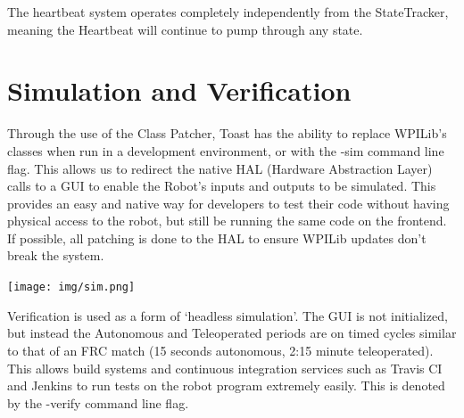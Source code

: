 \documentclass[a4paper,12pt]{article}
\begin{document}
The heartbeat system operates completely independently from the StateTracker, meaning the Heartbeat will continue to pump through any state.

\newpage

\section{Simulation and Verification}
Through the use of the Class Patcher, Toast has the ability to replace WPILib's classes when run in a development environment, or with the -sim command line flag. This allows us to redirect the native HAL (Hardware Abstraction Layer) calls to a GUI to enable the Robot's inputs and outputs to be simulated. This provides an easy and native way for developers to test their code without having physical access to the robot, but still be running the same code on the frontend. If possible, all patching is done to the HAL to ensure WPILib updates don't break the system. 

\texttt{[image: img/sim.png]}

Verification is used as a form of `headless simulation'. The GUI is not initialized, but instead the Autonomous and Teleoperated periods are on timed cycles similar to that of an FRC match (15 seconds autonomous, 2:15 minute teleoperated). This allows build systems and continuous integration services such as Travis CI and Jenkins to run tests on the robot program extremely easily. This is denoted by the -verify command line flag.
\end{document}
